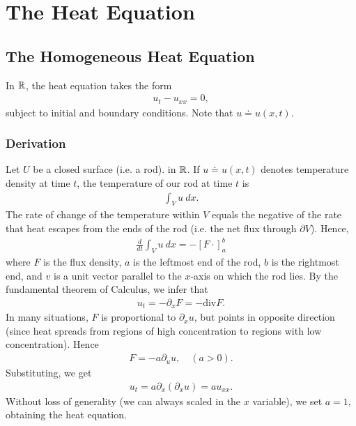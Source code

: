 \chapter{The Heat Equation}
\section{The Homogeneous Heat Equation}
In $\mathbb{R}$, the heat equation takes the form
\begin{equation*}
\begin{split}
	u_{t} - u_{xx} = 0,
\end{split}
\end{equation*}
subject to initial and boundary conditions. Note that $u \doteq u(x,t)$.
\subsection{Derivation}
Let $U$ be a closed surface (i.e. a rod). in $\mathbb{R}$. If $u \doteq u(x,t)$ denotes
temperature density at time $t$, the temperature of our rod at time $t$ is
\begin{equation*}
\begin{split}
	\int_{V} u \ dx.
\end{split}
\end{equation*}
The rate of change of the temperature within $V$ equals the negative of the
rate that heat escapes from the ends of the rod (i.e. the net flux through
$\partial V$). Hence,
\begin{equation*}
\begin{split}
	\frac{d}{dt} \int_{V} u \ dx = -\left[ F \cdot  \right]_{a}^{b}
\end{split}
\end{equation*}
where $F$ is the flux density, $a$ is the leftmost end of the rod, $b$ is the
rightmost end, and $v$ is a unit vector parallel to the $x$-axis on which the
rod lies. By the fundamental theorem of Calculus, we infer that
\begin{equation*}
\begin{split}
	u_{t} = -\partial_{x} F = -\text{div}F.
\end{split}
\end{equation*}
In many situations, $F$ is proportional to $\partial_{x} u$, but points in
opposite direction (since heat spreads from regions of high concentration to
regions with low concentration). Hence
\begin{equation*}
\begin{split}
	F = -a \partial_{u}u, \quad (a > 0).
\end{split}
\end{equation*}
Substituting, we get
\begin{equation*}
\begin{split}
	u_{t} = a \partial_{x}(\partial_{x} u ) = a u_{xx}.
\end{split}
\end{equation*}
Without loss of generality (we can always scaled in the $x$ variable), we set $a
= 1$, obtaining the heat equation.
